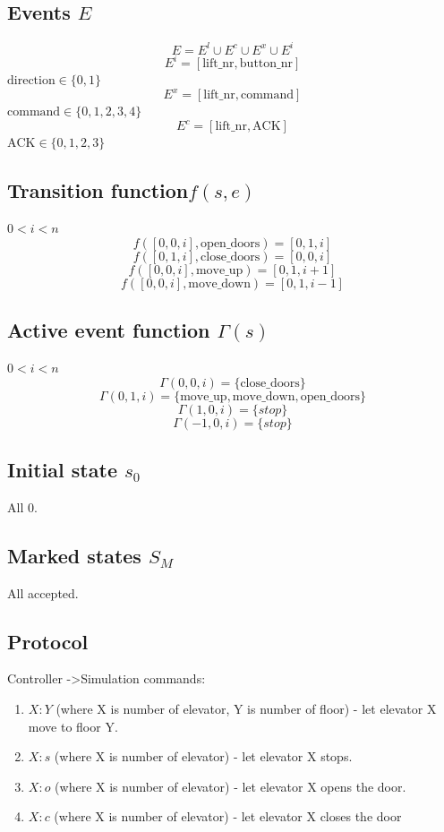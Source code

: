 \documentclass[12pt]{article}
\begin{document}
\subsection{Events \(E\)}

\[ E = E^l \cup E^c \cup E^x \cup E^i \]
\[ E^i = [\text{lift\_nr},\text{button\_nr}] \]
\(\text{direction} \in \{0,1\}\)
\[ E^x = [\text{lift\_nr}, \text{command}] \]
\(\text{command} \in \{0,1,2,3,4\}\)
\[ E^c = [\text{lift\_nr}, \text{ACK}] \]
\(\text{ACK} \in \{0,1,2,3\}\)

\subsection{Transition function\(f(s,e)\)}
\(0 < i < n\)
\[ f([0,0,i],\text{open\_doors}) = [0,1,i]\]
\[ f([0,1,i],\text{close\_doors}) = [0,0,i]\]
\[ f([0,0,i],\text{move\_up}) = [0,1,i+1]\]
\[ f([0,0,i],\text{move\_down}) = [0,1,i-1]\]

\subsection{Active event function \(\Gamma(s)\)}
\(0 < i < n\)
\[ \Gamma(0,0,i) = \{\text{close\_doors}\}\]
\[ \Gamma(0,1,i) = \{\text{move\_up},\text{move\_down},\text{open\_doors}\}\]
\[ \Gamma(1,0,i) = \{stop\}\]
\[ \Gamma(-1,0,i) = \{stop\}\]

\subsection{Initial state \(s_0\)}
All 0.

\subsection{Marked states \(S_M\)}
All accepted.


\subsection{Protocol}
Controller -\textgreater Simulation commands:
\begin{enumerate}
	\item $X:Y$ (where X is number of elevator, Y is number of floor) - let elevator X move to floor Y.
	\item $X:s$ (where X is number of elevator) - let elevator X stops.
	\item $X:o$ (where X is number of elevator) - let elevator X opens the door.
	\item $X:c$ (where X is number of elevator) - let elevator X closes the door
\end{enumerate}
\end{document}
